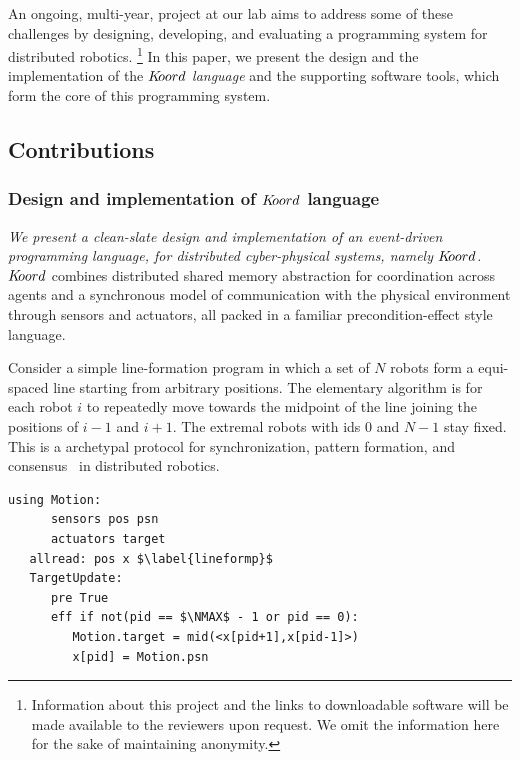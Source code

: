 An ongoing, multi-year, project at our lab aims to address some of these challenges by designing, developing, and evaluating a programming system for distributed robotics. \footnote{Information about this project and the links to downloadable software will be made available to the reviewers upon request. We omit the information here for the sake of maintaining anonymity.} In this paper, we present the design and the implementation of the  {\em $K\kern-2pt oord$ language} and the supporting software tools, which form the  core of this programming system.


%
%
\subsection{Contributions}
\subsubsection{Design and implementation of $K\kern-2pt oord$ language}
{\em We present a clean-slate design and implementation of an event-driven programming language, for distributed cyber-physical systems, namely $K\kern-2pt oord$.} 
%
$K\kern-2pt oord$ combines distributed shared memory abstraction for coordination across agents and a synchronous model of communication with the physical environment through sensors and actuators, all packed in a familiar precondition-effect style language.
%

Consider a simple line-formation program in which a set of $N$ robots form a equi-spaced line starting from arbitrary positions. The elementary algorithm is for each robot $i$ to repeatedly move towards the midpoint of the line joining the positions of $i-1$ and $i+1$. The extremal robots with ids $0$ and $N-1$ stay fixed. This is a archetypal protocol for synchronization, pattern formation, and consensus~\cite{Tsitsiklis:1986,Blondel,Magnusbook2010,Fax} in distributed robotics.
%
\begin{lstlisting}[label=lineform,caption=Lineform $\lgname$ program]
   using Motion:
      sensors pos psn
      actuators target
   allread: pos x $\label{lineformp}$
   TargetUpdate:
      pre True
      eff if not(pid == $\NMAX$ - 1 or pid == 0):
         Motion.target = mid(<x[pid+1],x[pid-1]>)
         x[pid] = Motion.psn
\end{lstlisting}

